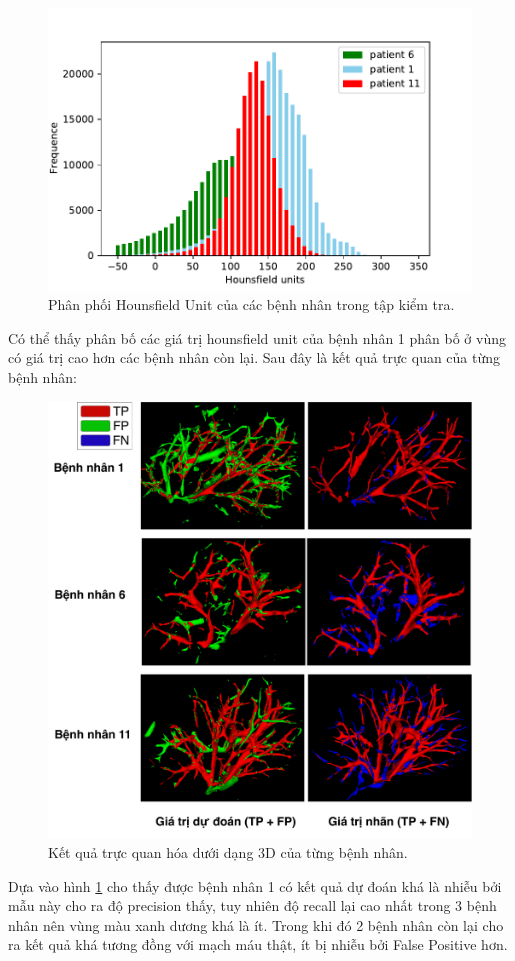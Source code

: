 \begin{figure}[H]
    \centering
    \includegraphics[width=.7\textwidth]{images/blood/test_hist.pdf}
    \caption{Phân phối Hounsfield Unit của các bệnh nhân trong tập kiểm tra.}
\end{figure}

Có thể thấy phân bố các giá trị hounsfield unit của bệnh nhân 1 phân bố ở vùng có giá trị cao hơn các bệnh nhân còn lại. Sau đây là kết quả trực quan của từng bệnh nhân:

\begin{figure}[H]
    \centering
    \includegraphics[width=\textwidth]{images/blood/3d_vessel.pdf}
    \caption{Kết quả trực quan hóa dưới dạng 3D của từng bệnh nhân.}
    \label{fig:3d-vessel}
\end{figure}

Dựa vào hình \ref{fig:3d-vessel} cho thấy được bệnh nhân 1 có kết quả dự đoán khá là nhiễu bởi mẫu này cho ra độ precision thấy, tuy nhiên độ recall lại cao nhất trong 3 bệnh nhân nên vùng màu xanh dương khá là ít. Trong khi đó 2 bệnh nhân còn lại cho ra kết quả khá tương đồng với mạch máu thật, ít bị nhiễu bởi False Positive hơn.
